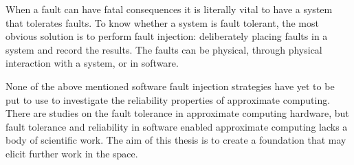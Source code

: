 When a fault can have fatal consequences it is literally vital to have a system that tolerates faults. To know whether a system is fault tolerant, the most obvious solution is to perform fault injection: deliberately placing faults in a system and record the results. The faults can be physical, through physical interaction with a system, or in software. 



None of the above mentioned software fault injection strategies have yet to be put to use to investigate the reliability properties of approximate computing. There are studies on the fault tolerance in approximate computing hardware, but fault tolerance and reliability in software enabled approximate computing lacks a body of scientific work. The aim of this thesis is to create a foundation that may elicit further work in the space.
